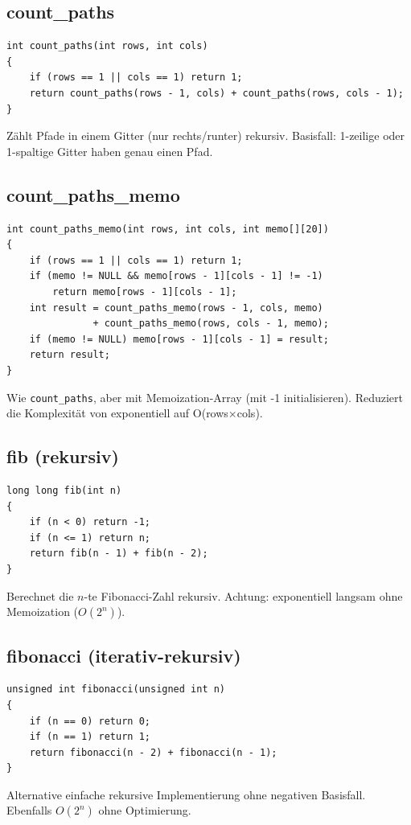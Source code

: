 \documentclass[10pt, a4paper]{article}
\begin{document}
\subsection{count\_paths}
\begin{lstlisting}
int count_paths(int rows, int cols)
{
    if (rows == 1 || cols == 1) return 1;
    return count_paths(rows - 1, cols) + count_paths(rows, cols - 1);
}
\end{lstlisting}
Z\"ahlt Pfade in einem Gitter (nur rechts/runter) rekursiv. Basisfall: 1-zeilige oder 1-spaltige Gitter haben genau einen Pfad.

\subsection{count\_paths\_memo}
\begin{lstlisting}
int count_paths_memo(int rows, int cols, int memo[][20])
{
    if (rows == 1 || cols == 1) return 1;
    if (memo != NULL && memo[rows - 1][cols - 1] != -1)
        return memo[rows - 1][cols - 1];
    int result = count_paths_memo(rows - 1, cols, memo)
               + count_paths_memo(rows, cols - 1, memo);
    if (memo != NULL) memo[rows - 1][cols - 1] = result;
    return result;
}
\end{lstlisting}
Wie \texttt{count\_paths}, aber mit Memoization-Array (mit -1 initialisieren). Reduziert die Komplexit\"at von exponentiell auf O(rows$\times$cols).

\subsection{fib (rekursiv)}
\begin{lstlisting}
long long fib(int n)
{
    if (n < 0) return -1;
    if (n <= 1) return n;
    return fib(n - 1) + fib(n - 2);
}
\end{lstlisting}
Berechnet die $n$-te Fibonacci-Zahl rekursiv. Achtung: exponentiell langsam ohne Memoization ($O(2^n)$).

\subsection{fibonacci (iterativ-rekursiv)}
\begin{lstlisting}
unsigned int fibonacci(unsigned int n)
{
    if (n == 0) return 0;
    if (n == 1) return 1;
    return fibonacci(n - 2) + fibonacci(n - 1);
}
\end{lstlisting}
Alternative einfache rekursive Implementierung ohne negativen Basisfall. Ebenfalls $O(2^n)$ ohne Optimierung.
\end{document}
